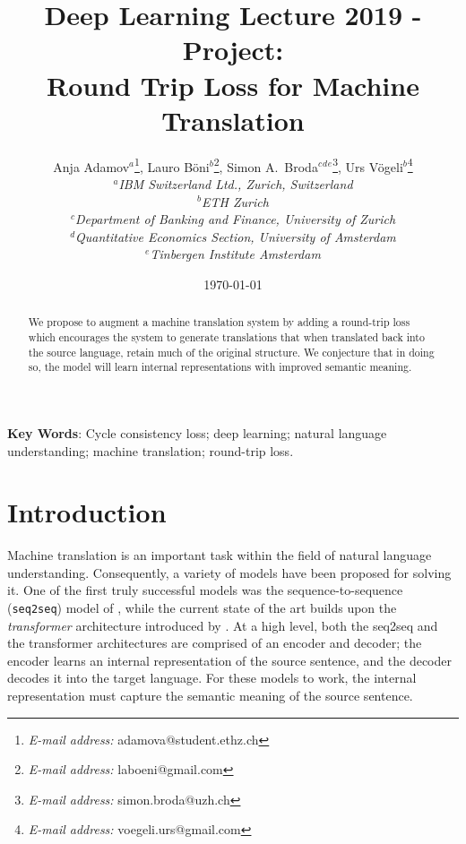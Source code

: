 \documentclass[11pt,a4paper]{article}
\begin{document}
\title{Deep Learning Lecture 2019 - Project:\\Round Trip Loss for Machine Translation}
\date{\today}
\author{
Anja Adamov$\mbox{}^a$\thanks{\emph{E-mail address:} adamova@student.ethz.ch},
Lauro B\"{o}ni$\mbox{}^b$\thanks{\emph{E-mail address:} laboeni@gmail.com},
Simon A.\ Broda$\mbox{}^c\mbox{}^d\mbox{}^e$\thanks{\emph{E-mail address:} simon.broda@uzh.ch},
Urs V\"{o}geli$\mbox{}^b$\thanks{\emph{E-mail address:} voegeli.urs@gmail.com}
\medskip \\
\textit{\small $\mbox{}^a$IBM Switzerland Ltd., Zurich, Switzerland}
\medskip \\
\textit{\small $\mbox{}^b$ETH Zurich}
\medskip \\
\textit{\small $\mbox{}^c$Department of Banking and Finance, University of Zurich}
\medskip \\
\textit{\small $\mbox{}^d$Quantitative Economics Section, University of Amsterdam}
\medskip \\
\textit{\small $\mbox{}^e$Tinbergen Institute Amsterdam}
}
\maketitle \setcounter{page}{0}\thispagestyle{empty}
\begin{abstract}
We propose to augment a machine translation system by adding a round-trip loss which encourages the system to generate translations that when translated back into the source language, retain much of the original structure. We conjecture that in doing so, the model will learn internal representations with improved semantic meaning.
\end{abstract}
\bigskip \textbf{Key Words}: Cycle consistency loss; deep learning; natural language understanding; machine translation; round-trip loss.
\newpage
\setcounter{page}{1}
\section{Introduction}
Machine translation is an important task within the field of natural language understanding. Consequently, a variety of models have been proposed for solving it. One of the first truly successful models was the sequence-to-sequence ({\tt seq2seq}) model of \citet{seq2seq}, while the current state of the art builds upon the \emph{transformer} architecture introduced by \citet{transformer}. At a high level, both the seq2seq and the transformer architectures are comprised of an encoder and decoder; the encoder learns an internal representation of the source sentence, and the decoder decodes it into the target language. For these models to work, the internal representation must capture the semantic meaning of the source sentence.
\end{document}
